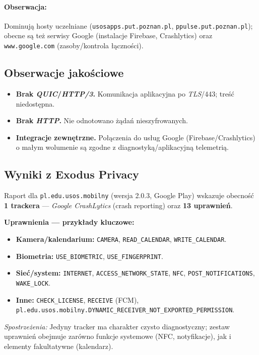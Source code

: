 \paragraph{Obserwacja:}
Dominują hosty uczelniane (\texttt{usosapps.put.poznan.pl}, \texttt{ppulse.put.poznan.pl}); obecne są też serwisy Google (instalacje Firebase, Crashlytics) oraz \texttt{www.google.com} (zasoby/kontrola łączności).

\subsection{Obserwacje jakościowe}
\begin{itemize}
  \item \textbf{Brak \emph{QUIC}/\emph{HTTP/3}.} Komunikacja aplikacyjna po \emph{TLS}/443; treść niedostępna.
  \item \textbf{Brak \emph{HTTP}.} Nie odnotowano żądań nieszyfrowanych.
  \item \textbf{Integracje zewnętrzne.} Połączenia do usług Google (Firebase/Crashlytics) o małym wolumenie są zgodne z diagnostyką/aplikacyjną telemetrią.
\end{itemize}

\subsection{Wyniki z Exodus Privacy \cite{ExodusPrivacy}}
Raport dla \texttt{pl.edu.usos.mobilny} (wersja 2.0.3, Google Play) wskazuje obecność \textbf{1 trackera} — \emph{Google CrashLytics} (crash reporting) oraz \textbf{13 uprawnień}.

\textbf{Uprawnienia — przykłady kluczowe:}
\begin{itemize}
  \item \textbf{Kamera/kalendarium:} \texttt{CAMERA}, \texttt{READ\_CALENDAR}, \texttt{WRITE\_CALENDAR}.
  \item \textbf{Biometria:} \texttt{USE\_BIOMETRIC}, \texttt{USE\_FINGERPRINT}.
  \item \textbf{Sieć/system:} \texttt{INTERNET}, \texttt{ACCESS\_NETWORK\_STATE}, \texttt{NFC}, \texttt{POST\_NOTIFICATIONS}, \texttt{WAKE\_LOCK}.
  \item \textbf{Inne:} \texttt{CHECK\_LICENSE}, \texttt{RECEIVE} (FCM), \nolinkurl{pl.edu.usos.mobilny.DYNAMIC\_RECEIVER\_NOT\_EXPORTED\_PERMISSION}.
\end{itemize}
\emph{Spostrzeżenia:} 
Jedyny tracker ma charakter czysto diagnostyczny; zestaw uprawnień obejmuje zarówno funkcje systemowe (NFC, notyfikacje), jak i elementy fakultatywne (kalendarz).

